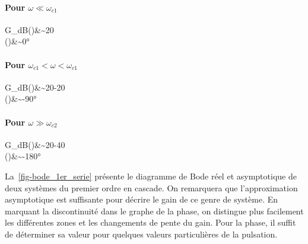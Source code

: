 \paragraph{Pour $\omega\ll\omega_{c1}$}
\begin{bequation}
G_{dB}(\omega)&\sim20\\
    \phi(\omega)&\sim0\si{\degree}
\end{bequation}
\paragraph{Pour $\omega_{c1}<\omega<\omega_{c1}$}
\begin{bequation}
G_{dB}(\omega)&\sim20-20\\
\phi(\omega)&\sim-90\si{\degree}
\end{bequation}
\paragraph{Pour $\omega\gg\omega_{c2}$}
\begin{bequation}
G_{dB}(\omega)&\sim20-40\\
\phi(\omega)&\sim-180\si{\degree}
\end{bequation}
La~\cref{fig-bode_1er_serie} présente le diagramme de Bode réel et 
asymptotique de deux systèmes du premier ordre en cascade. On remarquera 
que l'approximation asymptotique est suffisante pour décrire le gain de ce 
genre de système. En marquant la discontinuité dans le graphe de la phase, 
on distingue plus facilement les différentes zones et les changements de 
pente du gain. Pour la phase, il suffit de déterminer sa valeur pour 
quelques valeurs particulières de la pulsation. 


